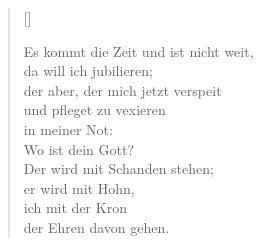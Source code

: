 \begin{center}
\settowidth{\versewidth}{Der, vor dem die Welt erschrickt,}
\begin{verse}[\versewidth]


 Es kommt die Zeit und ist nicht weit,\\
da will ich jubilieren;\\
der aber, der mich jetzt verspeit\\
und pfleget zu vexieren\\
in meiner Not:\\
Wo ist dein Gott?\\
Der wird mit Schanden stehen;\\
er wird mit Hohn,\\
ich mit der Kron\\
der Ehren davon gehen.

\end{verse}
\end{center}

